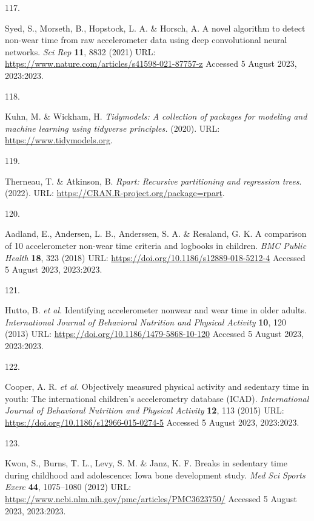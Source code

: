\documentclass[
  9pt,
]{scrbook}
\newlength{\cslhangindent}
\newlength{\csllabelwidth}
\newlength{\cslentryspacingunit} %
\newenvironment{CSLReferences}[2] %
 {%
  \setlength{\parindent}{0pt}
  \ifodd #1
  \let\oldpar\par
  \def\par{\hangindent=\cslhangindent\oldpar}
  \fi
  \setlength{\parskip}{#2\cslentryspacingunit}
 }%
 {}
\newcommand{\CSLLeftMargin}[1]{\parbox[t]{\csllabelwidth}{#1}}
\newcommand{\CSLRightInline}[1]{\parbox[t]{\linewidth - \csllabelwidth}{#1}\break}
\begin{document}
\begin{CSLReferences}{0}{0}
\leavevmode{}%
\CSLLeftMargin{117. }%
\CSLRightInline{Syed, S., Morseth, B., Hopstock, L. A. \& Horsch, A. A
novel algorithm to detect non-wear time from raw accelerometer data
using deep convolutional neural networks. \emph{Sci Rep} \textbf{11},
8832 (2021) URL:
\url{https://www.nature.com/articles/s41598-021-87757-z} Accessed 5
August 2023, 2023:2023.}

\leavevmode{}%
\CSLLeftMargin{118. }%
\CSLRightInline{Kuhn, M. \& Wickham, H. \emph{Tidymodels: A collection
of packages for modeling and machine learning using tidyverse
principles.} (2020). URL: \url{https://www.tidymodels.org}.}

\leavevmode{}%
\CSLLeftMargin{119. }%
\CSLRightInline{Therneau, T. \& Atkinson, B. \emph{Rpart: Recursive
partitioning and regression trees}. (2022). URL:
\url{https://CRAN.R-project.org/package=rpart}.}

\leavevmode{}%
\CSLLeftMargin{120. }%
\CSLRightInline{Aadland, E., Andersen, L. B., Anderssen, S. A. \&
Resaland, G. K. A comparison of 10 accelerometer non-wear time criteria
and logbooks in children. \emph{{BMC} Public Health} \textbf{18}, 323
(2018) URL: \url{https://doi.org/10.1186/s12889-018-5212-4} Accessed 5
August 2023, 2023:2023.}

\leavevmode{}%
\CSLLeftMargin{121. }%
\CSLRightInline{Hutto, B. \emph{et al.} Identifying accelerometer
nonwear and wear time in older adults. \emph{International Journal of
Behavioral Nutrition and Physical Activity} \textbf{10}, 120 (2013) URL:
\url{https://doi.org/10.1186/1479-5868-10-120} Accessed 5 August 2023,
2023:2023.}

\leavevmode{}%
\CSLLeftMargin{122. }%
\CSLRightInline{Cooper, A. R. \emph{et al.} Objectively measured
physical activity and sedentary time in youth: The international
children's accelerometry database ({ICAD}). \emph{International Journal
of Behavioral Nutrition and Physical Activity} \textbf{12}, 113 (2015)
URL: \url{https://doi.org/10.1186/s12966-015-0274-5} Accessed 5 August
2023, 2023:2023.}

\leavevmode{}%
\CSLLeftMargin{123. }%
\CSLRightInline{Kwon, S., Burns, T. L., Levy, S. M. \& Janz, K. F.
Breaks in sedentary time during childhood and adolescence: Iowa bone
development study. \emph{Med Sci Sports Exerc} \textbf{44}, 1075--1080
(2012) URL: \url{https://www.ncbi.nlm.nih.gov/pmc/articles/PMC3623750/}
Accessed 5 August 2023, 2023:2023.}


\end{CSLReferences}
\end{document}
